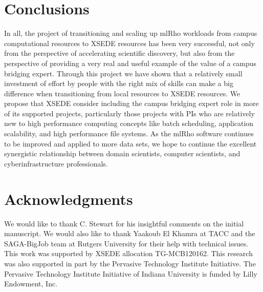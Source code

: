 \documentclass{sig-alternate}
\begin{document}
\section{Conclusions}\label{sec:conclusion}

In all, the project of transitioning and scaling up mlRho workloads from campus computational resources
to XSEDE resources has been very successful, not only from the perspective of accelerating scientific
discovery, but also from the perspective of providing a very real and useful example of the value of a campus
bridging expert. Through this project we have shown that a relatively small investment of effort by people
with the right mix of skills can make a big difference when transitioning from local
resources to XSEDE resources. We propose that XSEDE consider including the campus bridging expert role in more
of its supported projects, particularly those projects with PIs who are relatively new to high performance
computing concepts like batch scheduling, application scalability, and high performance file systems. As the
mlRho software continues to be improved and applied to more data sets, we hope to continue the excellent
synergistic relationship between domain scientists, computer scientists, and cyberinfrastructure
professionals.


\section{Acknowledgments}
We would like to thank C. Stewart for his insightful comments on the initial manuscript. We would also like to thank Yaakoub El Khamra at TACC and the SAGA-BigJob team at Rutgers University for their help with technical issues. This work was
supported by XSEDE allocation TG-MCB120162. This research was also supported in part by the Pervasive
Technology Institute Initiative. The Pervasive Technology Institute Initiative of Indiana University is funded
by Lilly Endowment, Inc.
%

%
%
\end{document}
